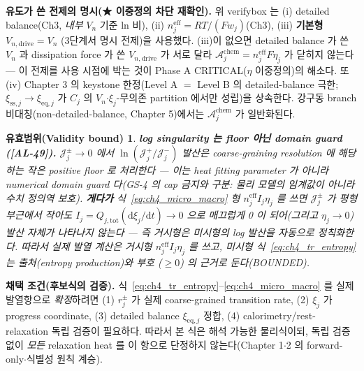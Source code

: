 \documentclass[11pt,a4paper]{article}
\newtheorem*{boundbox}{유효범위(Validity bound)}
\newcommand{\dd}{\mathrm{d}}
\newcommand{\eff}{\mathrm{eff}}
\newcommand{\eq}{\mathrm{eq}}
\newcommand{\drive}{\mathrm{drive}}
\newcommand{\tot}{\mathrm{tot}}
\newcommand{\chem}{\mathrm{chem}}
\newcommand{\sstat}{\mathrm{ss}}
\newcommand{\AL}[1]{\textsf{[AL-#1]}}
\begin{document}
\textbf{유도가 쓴 전제의 명시(★ 이중정의 차단 재확인).} 위 verifybox 는 (i) detailed balance(Ch3, \emph{내부}
$V_n$ 기준 ln 비), (ii) $n_j^{\eff}=RT/(Fw_j)$(Ch3), (iii) \textbf{기본형 $V_{n,\drive}=V_n$}
(3단계서 명시 전제)을 사용했다. (iii)이 없으면 detailed balance 가 쓴 $V_n$ 과 dissipation force 가 쓴
$V_{n,\drive}$ 가 서로 달라 $\mathcal A_j^{\chem}=n_j^{\eff}F\eta_j$ 가 닫히지 않는다 — 이 전제를 사용 시점에
박는 것이 Phase A CRITICAL($\eta$ 이중정의)의 해소다. 또 (iv) Chapter 3 의 keystone 한정(Level A $=$ Level B
의 detailed-balance 극한; $\xi_{\sstat,j}\to\xi_{\eq,j}$ 가 $C_j$ 의 $V_n$$\cdot$$\xi_j$-무의존 partition 에서만
성립)을 상속한다. 강구동 branch 비대칭(non-detailed-balance, Chapter 5)에서는 $\mathcal A_j^{\chem}$ 가 일반화된다.

\begin{boundbox}
\textbf{log singularity 는 floor 아닌 domain guard (\AL{49}).} $\mathcal J_j^\pm\to0$ 에서 $\ln(\mathcal J_j^+/\mathcal J_j^-)$
발산은 coarse-graining resolution 에 해당하는 작은 positive floor 로 처리한다 — 이는 heat fitting parameter 가
아니라 \emph{numerical domain guard} 다(GS-4 의 cap 금지와 구분: 물리 모델의 임계값이 아니라 수치 정의역 보호).
\textbf{게다가} 식~\eqref{eq:ch4_micro_macro} 형 $n_j^{\eff}I_j\eta_j$ 를 쓰면 $\mathcal J_j^\pm$ 가 평형 부근에서
작아도 $I_j=Q_{j,\tot}(\dd\xi_j/\dd t)\to0$ 으로 \emph{매끄럽게} 0 이 되어(그리고 $\eta_j\to0$) 발산 자체가
나타나지 않는다 — 즉 거시형은 미시형의 log 발산을 자동으로 정칙화한다. 따라서 실제 발열 계산은 거시형
$n_j^{\eff}I_j\eta_j$ 를 쓰고, 미시형 식~\eqref{eq:ch4_tr_entropy} 는 \emph{출처(entropy production)와 부호
($\ge0$) 의 근거}로 둔다(BOUNDED).
\end{boundbox}

\textbf{채택 조건(후보식의 검증).} 식~\eqref{eq:ch4_tr_entropy}--\eqref{eq:ch4_micro_macro} 를 실제 발열항으로
\emph{확정}하려면 (1) $r_j^\pm$ 가 실제 coarse-grained transition rate, (2) $\xi_j$ 가 progress coordinate,
(3) detailed balance $\xi_{\eq,j}$ 정합, (4) calorimetry/rest-relaxation 독립 검증이 필요하다. 따라서 본 식은
해석 가능한 물리식이되, 독립 검증 없이 \emph{모든} relaxation heat 를 이 항으로 단정하지 않는다(Chapter 1$\cdot$2
의 forward-only$\cdot$식별성 원칙 계승).

\end{document}
